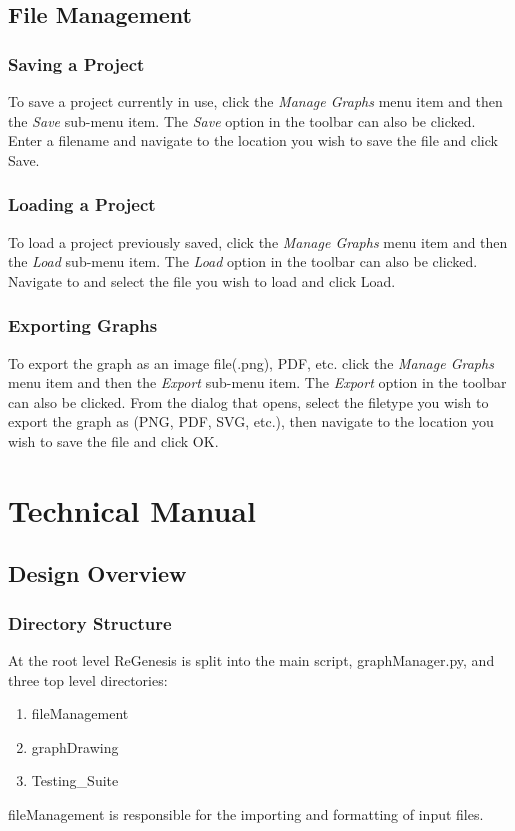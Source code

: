 \documentclass[11pt]{article}
\begin{document}
\subsection{File Management}
\subsubsection{Saving a Project}
To save a project currently in use, click the \textit{Manage Graphs} menu item and then the \textit{Save} sub-menu item. The \textit{Save} option in the toolbar can also be clicked. Enter a filename and navigate to the location you wish to save the
file and click Save.
\subsubsection{Loading a Project}
To load a project previously saved, click the \textit{Manage Graphs} menu item and then the \textit{Load} sub-menu item. The \textit{Load} option in the toolbar can also be clicked. Navigate to and select the file you wish to load and click Load.
\subsubsection{Exporting Graphs}
To export the graph as an image file(.png), PDF, etc. click the \textit{Manage Graphs} menu item and then the \textit{Export} sub-menu item. The \textit{Export} option in the toolbar can also be clicked.
From the dialog that opens, select the filetype you wish to export the graph as (PNG, PDF, SVG, etc.), then navigate to the location you wish to save the file and click OK.

\newpage
\section{Technical Manual}
\subsection{Design Overview}
\subsubsection{Directory Structure}
At the root level ReGenesis is split into the main script, graphManager.py, and three top level directories:
\begin{enumerate}
\item fileManagement
\item graphDrawing
\item Testing\_Suite
\end{enumerate}
fileManagement is responsible for the importing and formatting of input files.
\end{document}
